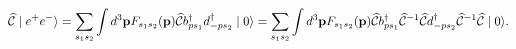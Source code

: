 \begin{equation}
\widehat{\mathcal{C}}\mid e^{+}e^{-}\rangle =\underset{s_{1}s_{2}}{\sum }%
\int d^{3}\mathbf{p}F_{s_{1}s_{2}}(\mathbf{p})\widehat{\mathcal{C}}%
b_{ps_{1}}^{\dagger }d_{-ps_{2}}^{\dagger }\mid 0\rangle =\underset{%
s_{1}s_{2}}{\sum }\int d^{3}\mathbf{p}F_{s_{1}s_{2}}(\mathbf{p})\widehat{%
\mathcal{C}}b_{ps_{1}}^{\dagger }\widehat{\mathcal{C}}^{-1}\widehat{\mathcal{%
C}}d_{-ps_{2}}^{\dagger }\widehat{\mathcal{C}}^{-1}\widehat{\mathcal{C}}\mid
0\rangle .
\end{equation}

